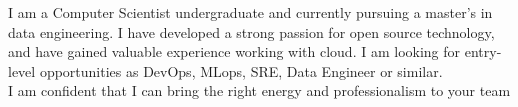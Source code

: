 \documentclass[letter,10pt]{article}
\begin{document}



I am a Computer Scientist undergraduate and currently pursuing a master's in data engineering. I have developed a strong passion for open source technology, and have gained valuable experience working with cloud. I am looking for entry-level opportunities as DevOps, MLops, SRE, Data Engineer or similar. \\
I am confident that I can bring the right energy and professionalism to your team


\end{document}

